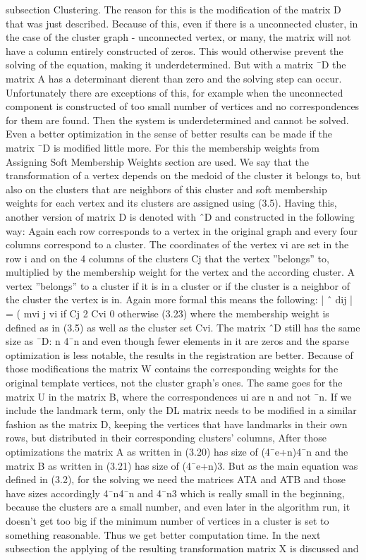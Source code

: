 \documentclass[../structure.tex]{subfiles}
\begin{document}
subsection Clustering. The reason for this is the modification of the matrix
D that was just described. Because of this, even if there is a unconnected
cluster, in the case of the cluster graph - unconnected vertex, or many, the
matrix will not have a column entirely constructed of zeros. This would
otherwise prevent the solving of the equation, making it underdetermined.
But with a matrix ¯D the matrix A has a determinant dierent than zero
and the solving step can occur. Unfortunately there are exceptions of this,
for example when the unconnected component is constructed of too small
number of vertices and no correspondences for them are found. Then the
system is underdetermined and cannot be solved.
Even a better optimization in the sense of better results can be made
if the matrix ¯D is modified little more. For this the membership weights
from Assigning Soft Membership Weights section are used. We say that the
transformation of a vertex depends on the medoid of the cluster it belongs to,
but also on the clusters that are neighbors of this cluster and soft membership
weights for each vertex and its clusters are assigned using (3.5). Having
this, another version of matrix D is denoted with ˆD and constructed in the
following way: Again each row corresponds to a vertex in the original graph
and every four columns correspond to a cluster. The coordinates of the vertex
vi are set in the row i and on the 4 columns of the clusters Cj that the vertex
”belongs” to, multiplied by the membership weight for the vertex and the
according cluster. A vertex ”belongs” to a cluster if it is in a cluster or if the
cluster is a neighbor of the cluster the vertex is in. Again more formal this
means the following:
| ˆ dij | =
(
mvi
j vi if Cj 2 Cvi
0 otherwise
(3.23)
where the membership weight is defined as in (3.5) as well as the cluster
set Cvi. The matrix ˆD still has the same size as ¯D: n  4¯n and even though
fewer elements in it are zeros and the sparse optimization is less notable, the
results in the registration are better.
Because of those modifications the matrix W contains the corresponding
weights for the original template vertices, not the cluster graph’s ones. The
same goes for the matrix U in the matrix B, where the correspondences ui
are n and not ¯n.
If we include the landmark term, only the DL matrix needs to be modified
in a similar fashion as the matrix D, keeping the vertices that have landmarks
in their own rows, but distributed in their corresponding clusters’ columns,
After those optimizations the matrix A as written in (3.20) has size of
(4¯e+n)4¯n and the matrix B as written in (3.21) has size of (4¯e+n)3. But
as the main equation was defined in (3.2), for the solving we need the matrices
ATA and ATB and those have sizes accordingly 4¯n4¯n and 4¯n3 which is
really small in the beginning, because the clusters are a small number, and
even later in the algorithm run, it doesn’t get too big if the minimum number
of vertices in a cluster is set to something reasonable. Thus we get better
computation time.
In the next subsection the applying of the resulting transformation matrix
X is discussed and
\end{document}
